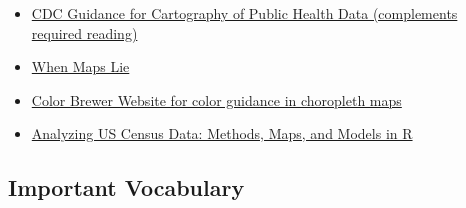 \documentclass[
]{book}
\providecommand{\tightlist}{%
  \setlength{\itemsep}{0pt}\setlength{\parskip}{0pt}}
\begin{document}
\begin{itemize}
\tightlist
\item
  \href{https://www.cdc.gov/dhdsp/maps/gisx/resources/tips-creating-ph-maps.html}{CDC Guidance for Cartography of Public Health Data (complements required reading)}
\item
  \href{https://www.citylab.com/design/2015/06/when-maps-lie/396761/}{When Maps Lie}
\item
  \href{http://colorbrewer2.org/\#}{Color Brewer Website for color guidance in choropleth maps}
\item
  \href{https://walker-data.com/census-r/}{Analyzing US Census Data: Methods, Maps, and Models in R}
\end{itemize}

\hypertarget{important-vocabulary-1}{%
\subsection{Important Vocabulary}\label{important-vocabulary-1}}

 
  \providecommand{\huxb}[2]{\arrayrulecolor[RGB]{#1}\global\arrayrulewidth=#2pt}
  \providecommand{\huxvb}[2]{\color[RGB]{#1}\vrule width #2pt}
  \providecommand{\huxtpad}[1]{\rule{0pt}{#1}}
  \providecommand{\huxbpad}[1]{\rule[-#1]{0pt}{#1}}
\end{document}
